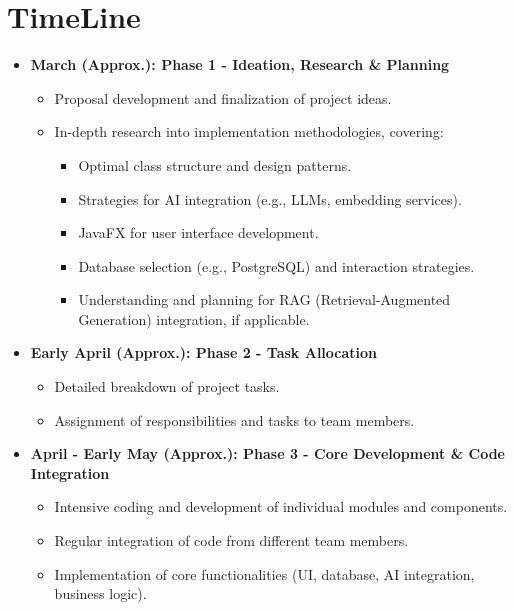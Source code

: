 \documentclass{article}
\begin{document}
\section*{TimeLine}
\begin{itemize}
    \item \textbf{March (Approx.): Phase 1 - Ideation, Research \& Planning}
    \begin{itemize}
        \item Proposal development and finalization of project ideas.
        \item In-depth research into implementation methodologies, covering:
        \begin{itemize}
            \item Optimal class structure and design patterns.
            \item Strategies for AI integration (e.g., LLMs, embedding services).
            \item JavaFX for user interface development.
            \item Database selection (e.g., PostgreSQL) and interaction strategies.
            \item Understanding and planning for RAG (Retrieval-Augmented Generation) integration, if applicable.
        \end{itemize}
    \end{itemize}

    \item \textbf{Early April (Approx.): Phase 2 - Task Allocation}
    \begin{itemize}
        \item Detailed breakdown of project tasks.
        \item Assignment of responsibilities and tasks to team members.
    \end{itemize}

    \item \textbf{April - Early May (Approx.): Phase 3 - Core Development \& Code Integration}
    \begin{itemize}
        \item Intensive coding and development of individual modules and components.
        \item Regular integration of code from different team members.
        \item Implementation of core functionalities (UI, database, AI integration, business logic).
    \end{itemize}


\end{itemize}
\end{document}
